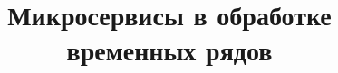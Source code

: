 \title{Микросервисы в обработке временных рядов}

\authorrspzapproval{}
\supervisorrspzapproval{}

\supervisorrspzgrade{}

\authorpzapproval{}
\supervisorpzapproval{}

\supervisorpzgrade{}

